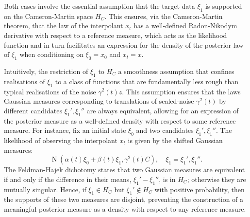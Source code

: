 \begin{remarkbox}
  \begin{remark}\label{rem:hc}
    Both cases involve the essential assumption that the target data \(\xi_{1}\) is supported on the Cameron-Martin space \(H_{C}\). This ensures, via the Cameron-Martin theorem, that the law of the interpolant \(x_{t}\) has a well-defined Radon-Nikodym derivative with respect to a reference measure, which acts as the likelihood function and in turn facilitates an expression for the density of the posterior law of \(\xi_{1}\) when conditioning on \(\xi_{0}=x_{0}\) and \(x_{t}=x\).

    Intuitively, the restriction of \(\xi_{1}\) to \(H_{C}\) a smoothness assumption that confines realisations of \(\xi_{1}\) to a class of functions that are fundamentally less rough than typical realisations of the noise \(\gamma^{2}(t) z\). This assumption ensures that the laws Gaussian measures corresponding to translations of scaled-noise \(\gamma^{2}(t)\) by different candidates \(\xi_{1}', \xi_{1}''\) are always equivalent, allowing for an expression of the posterior measure as a well-defined density with respect to some reference measure. For instance, fix an initial state \(\xi_{0}\) and two candidates \(\xi_{1}', \xi_{1}''\). The likelihood of observing the interpolant \(x_{t}\) is given by the shifted Gaussian measures:
    \[\operatorname{N}(\alpha(t) \xi_{0} + \beta(t) \xi_{1}, \gamma^{2}(t) C), \quad \xi_{1} = \xi_{1}',\xi_{1}''.\]
    The Feldman-Hajek dichotomy states that two Gaussian measures are equivalent if and only if the difference in their means, \(\xi_{1}' - \xi_{1}''\), is in \(H_{C}\); otherwise they are mutually singular. Hence, if \(\xi_{1} \in H_{C}\) but \(\xi_{1}' \notin H_{C}\) with positive probability, then the supports of these two measures are disjoint, preventing the construction of a meaningful posterior measure as a density with respect to any reference measure.
  \end{remark}
\end{remarkbox}

